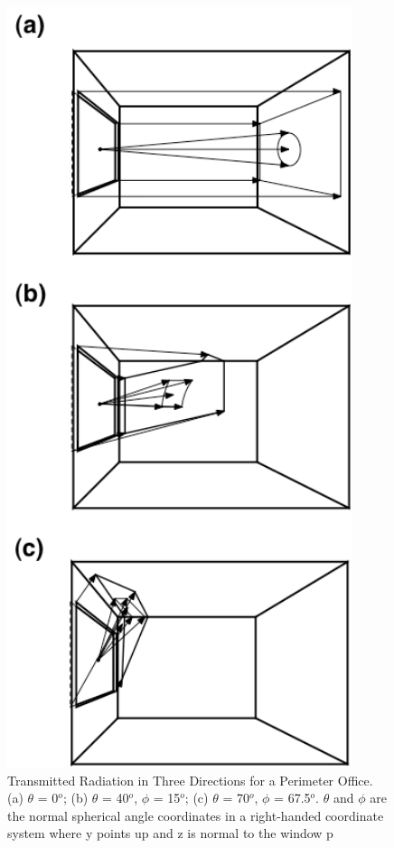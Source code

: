 \begin{figure}[hbtp] %
\centering
\includegraphics[width=0.9\textwidth, height=0.9\textheight, keepaspectratio=true]{media/image1326.png}
\caption{Transmitted Radiation in Three Directions for a Perimeter Office. (a) \(\theta\) = 0\(^{o}\); (b) \(\theta\) = 40\(^{o}\), \(\phi\) = 15\(^{o}\); (c) \(\theta\) = 70\(^{o}\), \(\phi\) = 67.5\(^{o}\).  \(\theta\) and \(\phi\) are the normal spherical angle coordinates in a right-handed coordinate system where y points up and z is normal to the window p \protect \label{fig:transmitted-radiation-in-three-directions-for}}
\end{figure}

